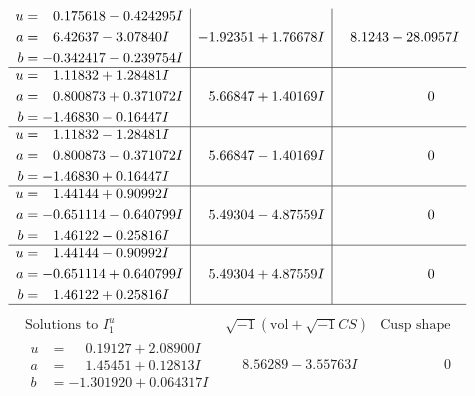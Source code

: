 \documentclass[1p]{elsarticle_modified}
\theoremstyle{definition}
\newcommand{\I}{\sqrt{-1}}
\begin{document}
$$\begin{array}{c|c|c}
\begin{aligned}
u &= \phantom{-}0.175618 - 0.424295 I \\
a &= \phantom{-}6.42637 - 3.07840 I \\
b &= -0.342417 - 0.239754 I\end{aligned}
 & -1.92351 + 1.76678 I & \phantom{-}8.1243 - 28.0957 I \\ \hline\begin{aligned}
u &= \phantom{-}1.11832 + 1.28481 I \\
a &= \phantom{-}0.800873 + 0.371072 I \\
b &= -1.46830 - 0.16447 I\end{aligned}
 & \phantom{-}5.66847 + 1.40169 I & \phantom{-0.000000 } 0 \\ \hline\begin{aligned}
u &= \phantom{-}1.11832 - 1.28481 I \\
a &= \phantom{-}0.800873 - 0.371072 I \\
b &= -1.46830 + 0.16447 I\end{aligned}
 & \phantom{-}5.66847 - 1.40169 I & \phantom{-0.000000 } 0 \\ \hline\begin{aligned}
u &= \phantom{-}1.44144 + 0.90992 I \\
a &= -0.651114 - 0.640799 I \\
b &= \phantom{-}1.46122 - 0.25816 I\end{aligned}
 & \phantom{-}5.49304 - 4.87559 I & \phantom{-0.000000 } 0 \\ \hline\begin{aligned}
u &= \phantom{-}1.44144 - 0.90992 I \\
a &= -0.651114 + 0.640799 I \\
b &= \phantom{-}1.46122 + 0.25816 I\end{aligned}
 & \phantom{-}5.49304 + 4.87559 I & \phantom{-0.000000 } 0\\
 \hline 
 \end{array}$$\newpage$$\begin{array}{c|c|c}  
\text{Solutions to }I^u_{1}& \I (\text{vol} + \sqrt{-1}CS) & \text{Cusp shape}\\
 \hline 
\begin{aligned}
u &= \phantom{-}0.19127 + 2.08900 I \\
a &= \phantom{-}1.45451 + 0.12813 I \\
b &= -1.301920 + 0.064317 I\end{aligned}
 & \phantom{-}8.56289 - 3.55763 I & \phantom{-0.000000 } 0 \\ \hline\begin{aligned}

\end{aligned}
\end{array}$$
\end{document}
